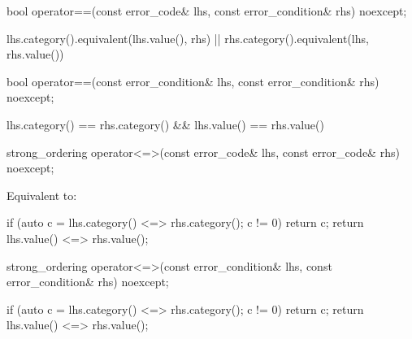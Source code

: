 %
%
\begin{itemdecl}
bool operator==(const error_code& lhs, const error_condition& rhs) noexcept;
\end{itemdecl}

\begin{itemdescr}
\pnum
\returns
\begin{codeblock}
lhs.category().equivalent(lhs.value(), rhs) || rhs.category().equivalent(lhs, rhs.value())
\end{codeblock}
\end{itemdescr}

%
\begin{itemdecl}
bool operator==(const error_condition& lhs, const error_condition& rhs) noexcept;
\end{itemdecl}

\begin{itemdescr}
\pnum
\returns
\begin{codeblock}
lhs.category() == rhs.category() && lhs.value() == rhs.value()
\end{codeblock}
\end{itemdescr}

%
\begin{itemdecl}
strong_ordering operator<=>(const error_code& lhs, const error_code& rhs) noexcept;
\end{itemdecl}

\begin{itemdescr}
\pnum
\effects
Equivalent to:
\begin{codeblock}
if (auto c = lhs.category() <=> rhs.category(); c != 0) return c;
return lhs.value() <=> rhs.value();
\end{codeblock}
\end{itemdescr}

%
\begin{itemdecl}
strong_ordering operator<=>(const error_condition& lhs, const error_condition& rhs) noexcept;
\end{itemdecl}

\begin{itemdescr}
\pnum
\returns
\begin{codeblock}
if (auto c = lhs.category() <=> rhs.category(); c != 0) return c;
return lhs.value() <=> rhs.value();
\end{codeblock}
\end{itemdescr}


